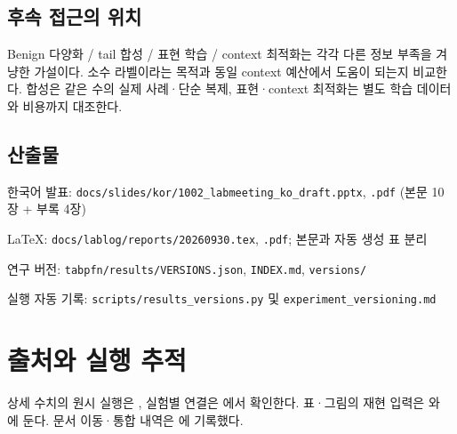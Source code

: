 \subsection{후속 접근의 위치}
Benign 다양화 /\allowbreak{} tail 합성 /\allowbreak{} 표현 학습 /\allowbreak{} context 최적화는 각각 다른 정보 부족을 겨냥한 가설이다. 소수 라벨이라는 목적과 동일 context 예산에서 도움이 되는지 비교한다. 합성은 같은 수의 실제 사례·단순 복제, 표현·context 최적화는 별도 학습 데이터와 비용까지 대조한다.

\subsection{산출물}
\par\noindent \textbullet\enspace 한국어 발표: \texttt{docs/\allowbreak{}\allowbreak{}sli\allowbreak{}des/\allowbreak{}\allowbreak{}kor/\allowbreak{}\allowbreak{}1002\_\allowbreak{}\allowbreak{}lab\allowbreak{}meeting\_\allowbreak{}\allowbreak{}ko\_\allowbreak{}\allowbreak{}draft\allowbreak{}.\allowbreak{}pptx}, \texttt{.\allowbreak{}pdf} (본문 10장 +\allowbreak{} 부록 4장)


\par\noindent \textbullet\enspace LaTeX: \texttt{docs/\allowbreak{}\allowbreak{}lab\allowbreak{}log/\allowbreak{}\allowbreak{}repo\allowbreak{}rts/\allowbreak{}\allowbreak{}2026\allowbreak{}0930.\allowbreak{}tex\allowbreak{}}, \texttt{.\allowbreak{}pdf}; 본문과 자동 생성 표 분리


\par\noindent \textbullet\enspace 연구 버전: \texttt{tabpfn/\allowbreak{}\allowbreak{}r\allowbreak{}esults/\allowbreak{}\allowbreak{}V\allowbreak{}ERSIONS.\allowbreak{}json}, \texttt{INDEX.\allowbreak{}md\allowbreak{}}, \texttt{versions\allowbreak{}/\allowbreak{}\allowbreak{}}


\par\noindent \textbullet\enspace 실행 자동 기록: \texttt{scripts/\allowbreak{}\allowbreak{}results\_\allowbreak{}\allowbreak{}versions\allowbreak{}.\allowbreak{}py} 및 \texttt{experime\allowbreak{}nt\_\allowbreak{}\allowbreak{}versi\allowbreak{}oning.\allowbreak{}md\allowbreak{}}




\section*{출처와 실행 추적}

상세 수치의 원시 실행은 , 실험별 연결은 에서 확인한다. 표·그림의 재현 입력은 와 에 둔다. 문서 이동·통합 내역은 에 기록했다.


